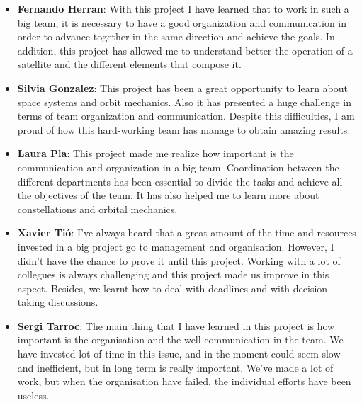 {\begin{itemize}
 
\item \textbf{Fernando Herran}: With this project I have learned that to work in such a big team, it is necessary to have a good organization and communication in order to advance together in the same direction and  achieve the goals. In addition, this project has allowed me to understand better the operation of a satellite and the different elements that compose it.

\item \textbf{Silvia Gonzalez}: This project has been a great opportunity to learn about space systems and orbit mechanics. Also it has presented a huge challenge in terms of team organization and communication. Despite this difficulties, I am proud of how this hard-working team has manage to obtain amazing results.

\item \textbf{Laura Pla}: This project made me realize how important is the communication and organization in a big team.  Coordination between the different departments has been essential to divide the tasks and achieve all the objectives of the team. It has also helped me to learn more about constellations and orbital mechanics.

\item \textbf{Xavier Tió}: I've always heard that a great amount of the time and resources invested in a big project go to management and organisation. However, I didn't have the chance to prove it until this project. Working with a lot of collegues is always challenging and this project made us improve  in this aspect. Besides, we learnt how to deal with deadlines and with decision taking discussions. 

\item \textbf{Sergi Tarroc}: The main thing that I have learned in this project is how important is the organisation and the well communication in the team. We have invested lot of time in this issue, and in the moment could seem slow and inefficient, but in long term is really important. We've made a lot of work, but when the organisation have failed, the individual efforts have been useless. 

\end{itemize}
}